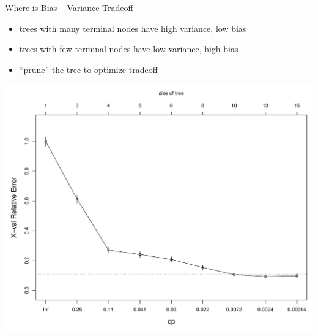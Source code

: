 \documentclass[12pt]{beamer}
\begin{document}
\begin{frame}{Where is Bias -- Variance Tradeoff}

  \begin{itemize}
  \item trees with many terminal nodes have high variance, low bias
  \item trees with few terminal nodes have low variance, high bias
  \item ``prune'' the tree to optimize tradeoff
  \end{itemize}

  \begin{center}
    \includegraphics[scale=0.3]{figs/cart_cv.pdf}
    \end{center}

  
\end{frame}








\end{document}
